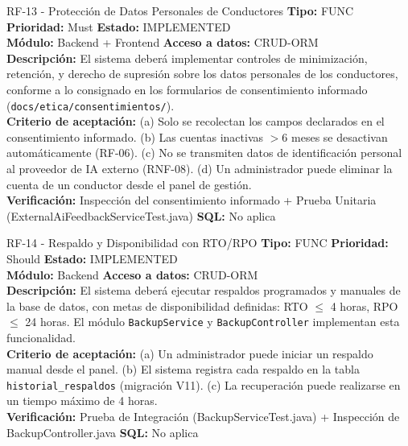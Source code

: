 \documentclass[11pt,a4paper]{article}
\begin{document}
\begin{requisito}{RF-13 - Protección de Datos Personales de Conductores}
    \textbf{Tipo:} FUNC \quad \textbf{Prioridad:} Must \quad \textbf{Estado:} IMPLEMENTED \\[0.2cm]
    \textbf{Módulo:} Backend + Frontend \quad \textbf{Acceso a datos:} CRUD-ORM \\[0.2cm]
    \textbf{Descripción:} El sistema deberá implementar controles de minimización, retención, y derecho de supresión sobre los datos personales de los conductores, conforme a lo consignado en los formularios de consentimiento informado (\texttt{docs/etica/consentimientos/}). \\[0.2cm]
    \textbf{Criterio de aceptación:} (a) Solo se recolectan los campos declarados en el consentimiento informado. (b) Las cuentas inactivas $>6$ meses se desactivan automáticamente (RF-06). (c) No se transmiten datos de identificación personal al proveedor de IA externo (RNF-08). (d) Un administrador puede eliminar la cuenta de un conductor desde el panel de gestión. \\[0.2cm]
    \textbf{Verificación:} Inspección del consentimiento informado + Prueba Unitaria (ExternalAiFeedbackServiceTest.java) \quad \textbf{SQL:} No aplica
\end{requisito}

\begin{requisito}{RF-14 - Respaldo y Disponibilidad con RTO/RPO}
    \textbf{Tipo:} FUNC \quad \textbf{Prioridad:} Should \quad \textbf{Estado:} IMPLEMENTED \\[0.2cm]
    \textbf{Módulo:} Backend \quad \textbf{Acceso a datos:} CRUD-ORM \\[0.2cm]
    \textbf{Descripción:} El sistema deberá ejecutar respaldos programados y manuales de la base de datos, con metas de disponibilidad definidas: RTO $\leq$ 4 horas, RPO $\leq$ 24 horas. El módulo \texttt{BackupService} y \texttt{BackupController} implementan esta funcionalidad. \\[0.2cm]
    \textbf{Criterio de aceptación:} (a) Un administrador puede iniciar un respaldo manual desde el panel. (b) El sistema registra cada respaldo en la tabla \texttt{historial\_respaldos} (migración V11). (c) La recuperación puede realizarse en un tiempo máximo de 4 horas. \\[0.2cm]
    \textbf{Verificación:} Prueba de Integración (BackupServiceTest.java) + Inspección de BackupController.java \quad \textbf{SQL:} No aplica
\end{requisito}
\end{document}
